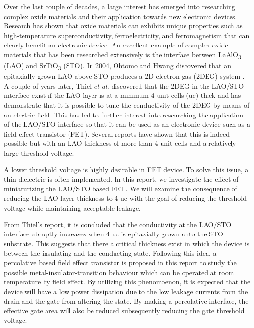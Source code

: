 \documentclass[11pt,a4paper]{report}
\begin{document}

Over the last couple of decades, a large interest has emerged into researching complex oxide materials and their application towards new electronic devices. Research has shown that oxide materials can exhibits unique properties such as high-temperature superconductivity, ferroelectricity, and ferromagnetism that can clearly benefit an electronic device. An excellent example of complex oxide materials that has been researched extensively is the interface between LaAlO\textsubscript{3} (LAO) and SrTiO\textsubscript{3} (STO). In 2004, Ohtomo and Hwang discovered that an epitaxially grown LAO above STO produces a 2D electron gas (2DEG) system \cite{ohtomo_hwang_2004}. A couple of years later, Thiel \textit{et al.} \cite{thiel_2006} discovered that the 2DEG in the LAO/STO interface exist if the LAO layer is at a minimum 4 unit cells (uc) thick and has demonstrate that it is possible to tune the conductivity of the 2DEG by means of an electric field. This has led to further interest into researching the application of the LAO/STO interface so that it can be used as an electronic device such as a field effect transistor (FET). Several reports have shown that this is indeed possible \cite{eerkes_wiel_hilgenkamp_2013,forg_richter_mannhart_2012,hosoda_hikita_hwang_bell_2013} but with an LAO thickness of more than 4 unit cells and a relatively large threshold voltage.

A lower threshold voltage is highly desirable in FET device. To solve this issue, a thin dielectric is often implemented. In this report, we investigate the effect of miniaturizing the LAO/STO based FET. We will examine the consequence of reducing the LAO layer thickness to 4 uc with the goal of reducing the threshold voltage while maintaining acceptable leakage.

From Thiel's \cite{thiel_2006} report, it is concluded that the conductivity at the LAO/STO interface abruptly increases when 4 uc is epitaxially grown onto the STO substrate. This suggests that there a critical thickness exist in which the device is between the insulating and the conducting state. Following this idea, a percolative based field effect transistor is proposed in this report to study the possible metal-insulator-transition behaviour which can be operated at room temperature by field effect. By utilizing this phenomoenon, it is expected that the device will have a low power dissipation due to the low leakage currents from the drain and the gate from altering the state. By making a percolative interface, the effective gate area will also be reduced subsequently reducing the gate threshold voltage.
\end{document}
